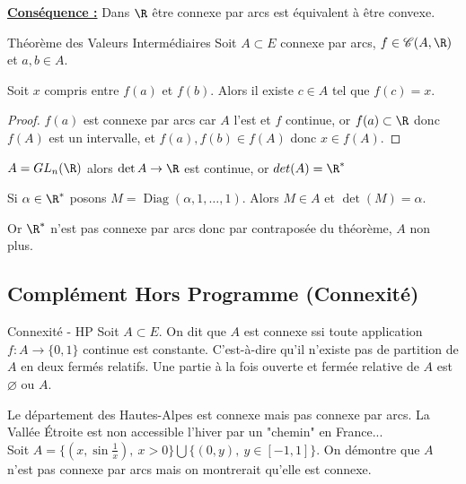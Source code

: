 \textbf{\uline{Conséquence :}} Dans $\R$ être connexe par arcs est équivalent à être convexe.

\begin{theoreme}{Théorème des Valeurs Intermédiaires}{}
    Soit $A \subset E$ connexe par arcs, $f \in \mathscr C(A, \R)$ et $a, b \in A$.

    Soit $x$ compris entre $f(a)$ et $f(b)$. Alors il existe $c \in A$ tel que $f(c) = x$.  
\end{theoreme}


\begin{proof}
    $f(a)$ est connexe par arcs car $A$ l'est et $f$ continue, or $f(a) \subset \R$ donc 
    $f(A)$ est un intervalle, et $f(a), f(b) \in f(A)$ donc $x \in f(A)$. 
\end{proof}

\begin{exemple}
    $A = GL_n(\R)$ alors $\det A \to \R$ est continue, or $det(A) = \R^*$

    Si $\alpha \in \R^*$ posons $M = \operatorname{Diag}(\alpha, 1, \ldots, 1)$. 
    Alors $M \in A$ et $\det(M) = \alpha$.

    Or $\R^*$ n'est pas connexe par arcs donc par contraposée du théorème, $A$ non plus. 
\end{exemple}

\subsection{Complément Hors Programme (Connexité)}

\begin{definition}{Connexité - HP}{}
    Soit $A \subset E$. 
    On dit que $A$ est connexe ssi toute application $f : A \to \{0, 1\}$ continue est constante. 
    C'est-à-dire qu'il n'existe pas de partition de $A$ en deux fermés relatifs.
    Une partie à la fois ouverte et fermée relative de $A$ est $\varnothing$ ou $A$.
\end{definition}

\begin{exemple}
    Le département des Hautes-Alpes est connexe mais pas connexe par arcs.
    La Vallée Étroite est non accessible l'hiver par un "chemin" en France... \\

    Soit $A = \{(x, \sin{\frac 1 x}),~x > 0\} \bigcup \{(0,y),~y\in [-1,1]\}$. On démontre que $A$ n'est pas connexe par arcs mais on montrerait qu'elle est connexe. 
\end{exemple}

